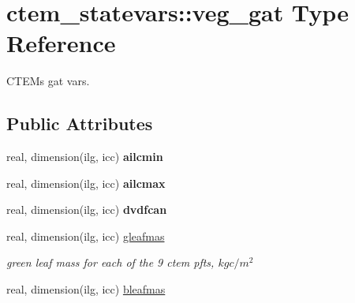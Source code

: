 \hypertarget{structctem__statevars_1_1veg__gat}{}\section{ctem\+\_\+statevars\+:\+:veg\+\_\+gat Type Reference}
\label{structctem__statevars_1_1veg__gat}


C\+T\+E\+M\textquotesingle{}s \textquotesingle{}gat\textquotesingle{} vars.  


\subsection*{Public Attributes}
\begin{DoxyCompactItemize}
\item 
\hypertarget{structctem__statevars_1_1veg__gat_a2ac5b1a71696eda0ce64bc51b022d1c5}{}real, dimension(ilg, icc) {\bfseries ailcmin}\label{structctem__statevars_1_1veg__gat_a2ac5b1a71696eda0ce64bc51b022d1c5}

\item 
\hypertarget{structctem__statevars_1_1veg__gat_adfc2b4f5b59b87e3e73e6ce81d481362}{}real, dimension(ilg, icc) {\bfseries ailcmax}\label{structctem__statevars_1_1veg__gat_adfc2b4f5b59b87e3e73e6ce81d481362}

\item 
\hypertarget{structctem__statevars_1_1veg__gat_aac21a8c67a625770bb9f2b83085630b9}{}real, dimension(ilg, icc) {\bfseries dvdfcan}\label{structctem__statevars_1_1veg__gat_aac21a8c67a625770bb9f2b83085630b9}

\item 
\hypertarget{structctem__statevars_1_1veg__gat_a961e416c64480c6f1c844b7a17fc2fc3}{}real, dimension(ilg, icc) \hyperlink{structctem__statevars_1_1veg__gat_a961e416c64480c6f1c844b7a17fc2fc3}{gleafmas}\label{structctem__statevars_1_1veg__gat_a961e416c64480c6f1c844b7a17fc2fc3}

\begin{DoxyCompactList}\small\item\em green leaf mass for each of the 9 ctem pfts, $kg c/m^2$ \end{DoxyCompactList}\item 
\hypertarget{structctem__statevars_1_1veg__gat_a061bac9273416adaccc63318c575243c}{}real, dimension(ilg, icc) \hyperlink{structctem__statevars_1_1veg__gat_a061bac9273416adaccc63318c575243c}{bleafmas}\label{structctem__statevars_1_1veg__gat_a061bac9273416adaccc63318c575243c}


\end{DoxyCompactItemize}
